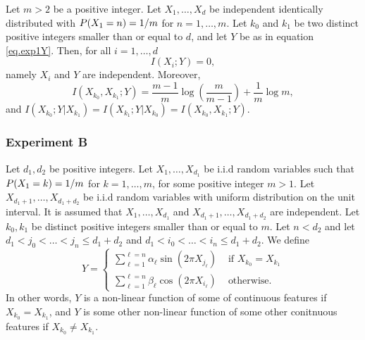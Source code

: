 \begin{lemma}
	\label{lemma.experiment1}
	Let $m>2$ be a positive integer. 
	Let
	$X_1, \dots, X_d$
	be independent identically distributed
	with 
	${{P}}(X_1 = n) = 1 / m$
	for $n=1, \dots, m$. 
	Let 
	$k_0$ and $k_1$ 
	be two distinct positive integers 
	smaller than or equal to $d$,
	and let $Y$
	be as in equation \eqref{eq.exp1Y}.
	Then,
	for all $i=1, \dots, d$
	\begin{equation}
		\label{eq.exp1pairwisemi}
		I(X_i; Y) = 0,
	\end{equation}
	namely $X_i$ and $Y$ are independent. 
	Moreover,
	\begin{equation}
		\label{eq.exp1mi}
		I(X_{k_0}, X_{k_1}; Y) 
		=
			\frac{m-1}{m} \log\left(\frac{m}{m-1}\right)
			+
			\frac{1}{m}\log m
			,
	\end{equation}
	and $I(X_{k_0}; Y \lvert X_{k_1}) = I(X_{k_1}; Y \lvert X_{k_0})  = I(X_{k_0}, X_{k_1} ; Y)$.
\end{lemma}




\subsubsection{Experiment B}

Let 
$d_1, d_2$
be positive integers.
Let
$X_1, \dots, X_{d_1}$
be i.i.d random variables
such that
${{P}}(X_1 = k) = 1/m$
for $k=1, \dots, m$,
for some positive integer 
$m > 1$.
Let 
$X_{d_1 + 1}, \dots, X_{d_1 + d_2}$
be i.i.d random variables with uniform distribution on the unit interval. 
It is assumed that 
$X_1, \dots, X_{d_1}$
and
$X_{d_1 + 1}, \dots, X_{d_1 + d_2}$
are independent. 
Let 
$k_0, k_1$
be distinct positive integers 
smaller than or equal to
$m$.
Let 
$n < d_2$
and 
let
$d_1 < j_0 <  \dots < j_n \leq d_1 + d_2$
and
$d_1 < i_0 <  \dots < i_n \leq d_1 + d_2$.
We define
\begin{equation}
	\label{eq.exp2target}
	Y 
	=
	\begin{cases}
		\sum_{\ell = 1}^{\ell=n} \alpha_\ell \sin\left(2\pi X_{j_\ell}\right)  
		& \text{ if } X_{k_0} = X_{k_1}
		\\
		\sum_{\ell = 1}^{\ell=n} \beta_\ell \cos\left(2\pi X_{i_\ell}\right)  
		& \text{ otherwise}.
	\end{cases}
\end{equation}
In other words,
$Y$ 
is a non-linear function of some of continuous features
if 
$X_{k_0} = X_{k_1}$,
and 
$Y$ 
is some other non-linear function of some other conitnuous features 
if 
$X_{k_0} \neq X_{k_1}$.



